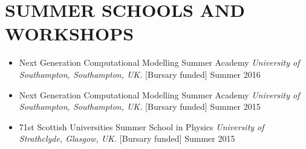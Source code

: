 \section{SUMMER SCHOOLS AND WORKSHOPS}
\begin{itemize}
\item Next Generation Computational Modelling Summer Academy {\sl University of Southampton, Southampton, UK.} [Bursary funded] \hfill Summer 2016 \\
\item Next Generation Computational Modelling Summer Academy {\sl University of Southampton, Southampton, UK.} [Bursary funded] \hfill Summer 2015 \\
\item 71st Scottish Universities Summer School in Physics {\sl University of Strathclyde, Glasgow, UK.}  [Bursary funded] \hfill Summer 2015 
\end{itemize}